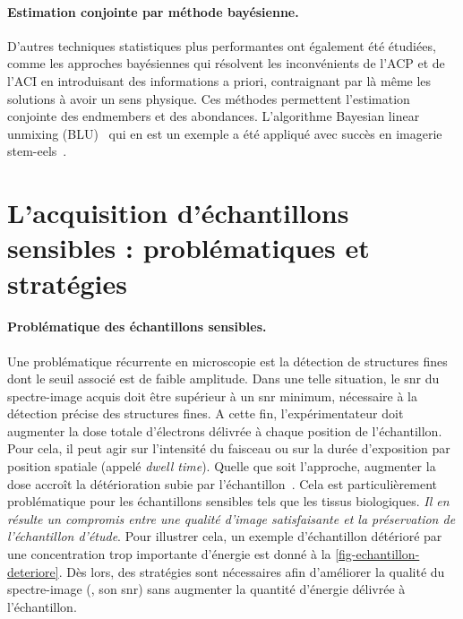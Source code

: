    \paragraph{Estimation conjointe par méthode bayésienne.} D'autres techniques statistiques plus performantes ont également été étudiées, comme les approches bayésiennes qui résolvent les inconvénients de l'ACP et de l'ACI en introduisant des informations a priori, contraignant par là même les solutions à avoir un sens physique. Ces méthodes permettent l'estimation conjointe des endmembers et des abondances. L'algorithme Bayesian linear unmixing (BLU)~\cite{dobigeon2009joint} qui en est un exemple a été appliqué avec succès en imagerie \gls{stem}-\gls{eels}~\cite{dobigeon2012spectral}.
    
    
    \section{L'acquisition d'échantillons sensibles : problématiques et stratégies}\label{sec-ech-sensibles}

    \paragraph{Problématique des échantillons sensibles.} Une problématique récurrente en microscopie est la détection de structures fines dont le seuil associé est de faible amplitude. Dans une telle situation, le \gls{snr} du spectre-image acquis doit être supérieur à un \gls{snr} minimum, nécessaire à la détection précise des structures fines. A cette fin, l'expérimentateur doit augmenter la dose totale d'électrons délivrée à chaque position de l'échantillon. Pour cela, il peut agir sur l'intensité du faisceau ou sur la durée d'exposition par position spatiale (appelé \emph{dwell time}). Quelle que soit l'approche, augmenter la dose accroît la détérioration subie par l'échantillon~\cite{egerton2004radiation}. Cela est particulièrement problématique pour les échantillons sensibles tels que les tissus biologiques. 
    \emph{Il en résulte un compromis entre une qualité d'image satisfaisante et la préservation de l'échantillon d'étude}. Pour illustrer cela, un exemple d'échantillon détérioré par une concentration trop importante d'énergie est donné à la \cref{fig-echantillon-deteriore}. Dès lors, des stratégies sont nécessaires afin d'améliorer la qualité du spectre-image (\ie{}, son \gls{snr}) sans augmenter la quantité d'énergie délivrée à l'échantillon.

